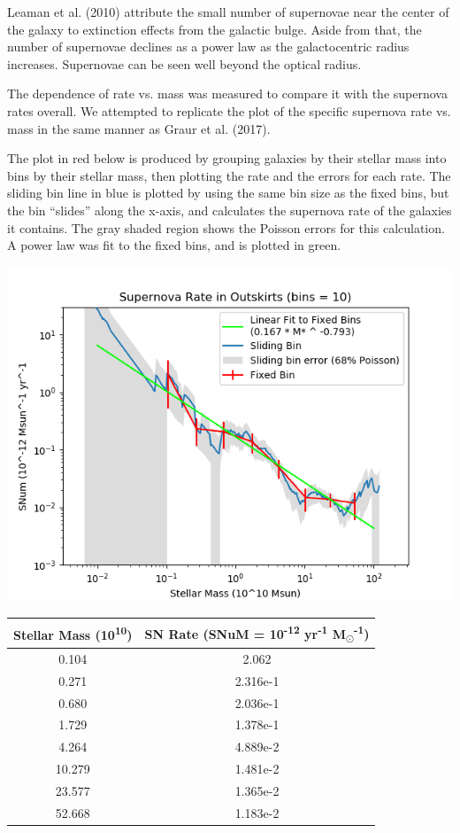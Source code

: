 \documentclass[apj]{emulateapj}
\begin{document}
Leaman et al. (2010) attribute the small number of supernovae near the center of the galaxy to extinction effects from the galactic bulge. Aside from that, the number of supernovae declines as a power law as the galactocentric radius increases. Supernovae can be seen well beyond the optical radius.

The dependence of rate vs. mass was measured to compare it with the supernova rates overall. We attempted to replicate the plot of the specific supernova rate vs. mass in the same manner as Graur et al. (2017).

The plot in red below is produced by grouping galaxies by their stellar mass into bins by their stellar mass, then plotting the rate and the errors for each rate. The sliding bin line in blue is plotted by using the same bin size as the fixed bins, but the bin “slides” along the x-axis, and calculates the supernova rate of the galaxies it contains. The gray shaded region shows the Poisson errors for this calculation. A power law was fit to the fixed bins, and is plotted in green.

\includegraphics[scale=0.5]{outskirts_sn_rate_vs_mass}

\begin{center}
  \begin{tabular}{| c | c |}
  \hline
    Stellar Mass (10\textsuperscript{10}) & SN Rate (SNuM = 10\textsuperscript{-12} yr\textsuperscript{-1} M\textsubscript{$\odot$}\textsuperscript{-1}) \\
  \hline
    0.104 & 2.062 \\
    0.271 & 2.316e-1 \\
    0.680 & 2.036e-1 \\
    1.729 & 1.378e-1 \\
    4.264 & 4.889e-2 \\
    10.279 & 1.481e-2 \\
    23.577 & 1.365e-2 \\
    52.668 & 1.183e-2 \\
  \hline
  \end{tabular}
\end{center}
\end{document}
